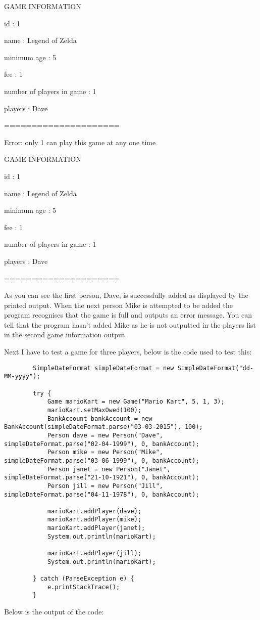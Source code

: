\documentclass[a4paper]{article}
\begin{document}
\noindent GAME INFORMATION

\noindent id : 1

\noindent name : Legend of Zelda

\noindent minimum age : 5

\noindent fee : 1

\noindent number of players in game : 1

\noindent players : Dave 

\noindent =====================

\noindent Error: only 1 can play this game at any one time

\noindent GAME INFORMATION

\noindent id : 1

\noindent name : Legend of Zelda

\noindent minimum age : 5

\noindent fee : 1

\noindent number of players in game : 1

\noindent players : Dave 

\noindent ===================== \newline

As you can see the first person, Dave, is successfully added as displayed by the printed output. When the next person Mike is attempted to be added the program recognises that the game is full and outputs an error message. You can tell that the program hasn't added Mike as he is not outputted in the players list in the second game information output.

Next I have to test a game for three players, below is the code used to test this: \begin{lstlisting}
		SimpleDateFormat simpleDateFormat = new SimpleDateFormat("dd-MM-yyyy");

        try {
            Game marioKart = new Game("Mario Kart", 5, 1, 3);
            marioKart.setMaxOwed(100);
            BankAccount bankAccount = new BankAccount(simpleDateFormat.parse("03-03-2015"), 100);
            Person dave = new Person("Dave", simpleDateFormat.parse("02-04-1999"), 0, bankAccount);
            Person mike = new Person("Mike", simpleDateFormat.parse("03-06-1999"), 0, bankAccount);
            Person janet = new Person("Janet", simpleDateFormat.parse("21-10-1921"), 0, bankAccount);
            Person jill = new Person("Jill", simpleDateFormat.parse("04-11-1978"), 0, bankAccount);

            marioKart.addPlayer(dave);
            marioKart.addPlayer(mike);
            marioKart.addPlayer(janet);
            System.out.println(marioKart);

            marioKart.addPlayer(jill);
            System.out.println(marioKart);

        } catch (ParseException e) {
            e.printStackTrace();
        }
\end{lstlisting}
Below is the output of the code: \newline
\end{document}
